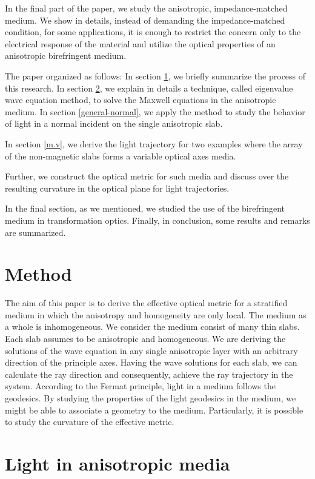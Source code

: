 \documentclass[9pt,twocolumn,twoside]{osajnl}
\begin{document}
 In the final part of the paper, we study the anisotropic, impedance-matched medium. We show in details, instead of demanding the impedance-matched condition, for some applications, it is enough to restrict the concern only to the electrical response of the material and utilize the optical properties of an anisotropic birefringent medium. 
 
 
The paper organized as follows: 
In section \ref{method}, we briefly summarize the process of this research.
In section \ref{li}, we explain in details a technique, called eigenvalue wave equation method, to solve the Maxwell equations in the anisotropic medium. 
In section \ref{general-normal}, we apply the method to study the behavior of light in a normal incident on the single anisotropic slab.

In section \ref{m.v}, we derive the light trajectory for two examples where the array of the non-magnetic slabs forms a variable optical axes media. 

Further, we construct the optical metric for such media and discuss over the resulting curvature in the optical plane for light trajectories.

In the final section, as we mentioned, we studied the use of the birefringent medium in transformation optics.
Finally, in conclusion, some results and remarks are summarized. 

\section{ Method}\label{method}

The aim of this paper is to derive the effective optical metric for a stratified medium in which the anisotropy and homogeneity are only local. The medium as a whole is inhomogeneous.
We consider the medium consist of many thin slabs. Each slab assumes to be anisotropic and homogeneous. We are deriving the solutions of the wave equation in any single anisotropic layer with an arbitrary direction of the principle axes. Having the wave solutions for each slab, we can calculate the ray direction and consequently, achieve the ray trajectory in the system. 
According to the Fermat principle, light in a medium follows the geodesics. By studying the properties of the light geodesics in the medium, we might be able to associate a geometry to the medium. Particularly, it is possible to study the curvature of the effective metric.

\section{Light in anisotropic media}\label{li}
\end{document}
